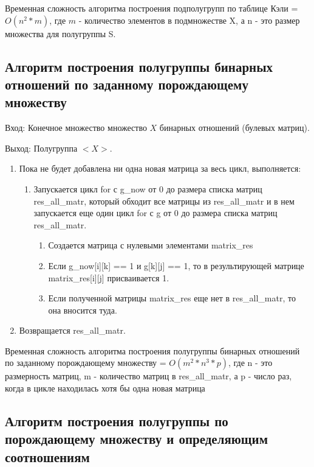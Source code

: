 \documentclass[bachelor, och, labwork]{shiza}
\begin{document}
	Временная сложность алгоритма построения подполугрупп по таблице Кэли = $O(n^2 * m)$, где $m$ - количество элементов в подмножестве X, а n - это размер множества для полугруппы S.
	
	\subsection{Алгоритм построения полугруппы бинарных отношений по заданному порождающему множеству}
	
	$\textit{Вход:}$ Конечное множество множество $X$ бинарных отношений (булевых матриц).
	
	$\textit{Выход:}$  Полугруппа $<X>$.
	
	\begin{enumerate} 
		\item Пока не будет добавлена ни одна новая матрица за весь цикл, выполняется:
		\begin{enumerate} 
			\item Запускается цикл for с g\_now от 0 до размера списка матриц res\_all\_matr, который обходит все матрицы из res\_all\_matr и в нем запускается еще один цикл for с g от 0 до размера списка матриц res\_all\_matr.
				\begin{enumerate} 
						\item Создается матрица с нулевыми элементами  matrix\_res
						\item Если g\_now[i][k] == 1 и  g[k][j] == 1, то в результирующей матрице matrix\_res[i][j] присваивается 1.
						\item Если полученной матрицы matrix\_res еще нет в res\_all\_matr, то она вносится туда.
				\end{enumerate}
		\end{enumerate}
		\item Возвращается res\_all\_matr.
	\end{enumerate} 
	
	Временная сложность алгоритма построения полугруппы бинарных отношений по заданному порождающему множеству = $O(m^2 * n^3 * p)$, где n - это размерность матриц, m - количество матриц в res\_all\_matr, а p - число раз, когда в цикле находилась хотя бы одна новая матрица
	
	\subsection{Алгоритм построения полугруппы по порождающему множеству и определяющим соотношениям}
	
\end{document}
